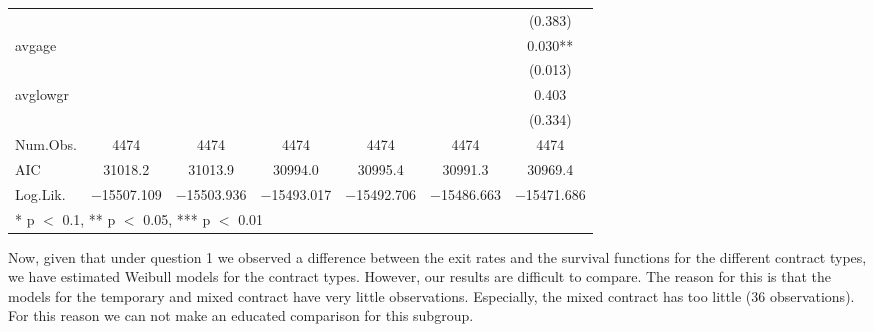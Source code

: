 \documentclass[
]{article}
\begin{document}
\begin{table}[!h]
{\begin{tabular}[t]{lcccccc}
 &  &  &  &  &  & (\num{0.383})\\
avgage &  &  &  &  &  & \num{0.030}**\\
 &  &  &  &  &  & (\num{0.013})\\
avglowgr &  &  &  &  &  & \num{0.403}\\
 &  &  &  &  &  & (\num{0.334})\\
\midrule
Num.Obs. & \num{4474} & \num{4474} & \num{4474} & \num{4474} & \num{4474} & \num{4474}\\
AIC & \num{31018.2} & \num{31013.9} & \num{30994.0} & \num{30995.4} & \num{30991.3} & \num{30969.4}\\
Log.Lik. & \num{-15507.109} & \num{-15503.936} & \num{-15493.017} & \num{-15492.706} & \num{-15486.663} & \num{-15471.686}\\
\bottomrule
\multicolumn{7}{l}{\rule{0pt}{1em}* p $<$ 0.1, ** p $<$ 0.05, *** p $<$ 0.01}\\
\end{tabular}}
\end{table}

Now, given that under question 1 we observed a difference between the
exit rates and the survival functions for the different contract types,
we have estimated Weibull models for the contract types. However, our
results are difficult to compare. The reason for this is that the models
for the temporary and mixed contract have very little observations.
Especially, the mixed contract has too little (36 observations). For
this reason we can not make an educated comparison for this subgroup.
\end{document}
